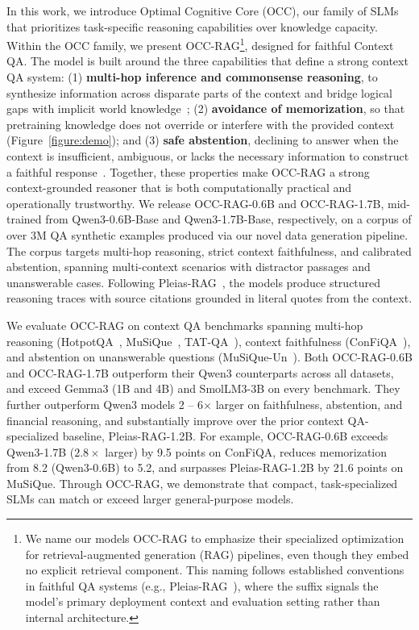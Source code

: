 In this work, we introduce Optimal Cognitive Core (OCC), our family of SLMs that prioritizes task-specific reasoning capabilities over knowledge capacity. Within the OCC family, we present OCC-RAG\footnote{We name our models OCC-RAG to emphasize their specialized optimization for retrieval-augmented generation (RAG) pipelines, even though they embed no explicit retrieval component. This naming follows established conventions in faithful QA systems (e.g., Pleias-RAG~\citep{pleias}), where the suffix signals the model's primary deployment context and evaluation setting rather than internal architecture.}, designed for faithful Context QA. The model is built around the three capabilities that define a strong context QA system: (1) \textbf{multi-hop inference and commonsense reasoning}, to synthesize information across disparate parts of the context and bridge logical gaps with implicit world knowledge~\citep{yu2023naturallanguagereasoningsurvey}; (2) \textbf{avoidance of memorization}, so that pretraining knowledge does not override or interfere with the provided context~\citep{ghosh2024quantifying} (Figure~\ref{figure:demo}); and (3) \textbf{safe abstention}, declining to answer when the context is insufficient, ambiguous, or lacks the necessary information to construct a faithful response~\citep{kirichenko2026abstentionbench}. Together, these properties make OCC-RAG a strong context-grounded reasoner that is both computationally practical and operationally trustworthy. We release OCC-RAG-0.6B and OCC-RAG-1.7B, mid-trained from Qwen3-0.6B-Base and Qwen3-1.7B-Base, respectively, on a corpus of over 3M QA synthetic examples produced via our novel data generation pipeline. The corpus targets multi-hop reasoning, strict context faithfulness, and calibrated abstention, spanning multi-context scenarios with distractor passages and unanswerable cases. Following Pleias-RAG~\citep{pleias}, the models produce structured reasoning traces with source citations grounded in literal quotes from the context. 

We evaluate OCC-RAG on context QA benchmarks spanning multi-hop reasoning (HotpotQA~\citep{hotpotqa}, MuSiQue~\citep{musique}, TAT-QA~\citep{tat-qa}), context faithfulness (ConFiQA~\citep{bi-etal-2025-context}), and abstention on unanswerable questions (MuSiQue-Un~\cite{musique}). Both OCC-RAG-0.6B and OCC-RAG-1.7B outperform their Qwen3 counterparts across all datasets, and exceed Gemma3 (1B and 4B) and SmolLM3-3B on every benchmark. They further outperform Qwen3 models 2 -- 6$\times$ larger on faithfulness, abstention, and financial reasoning, and substantially improve over the prior context QA-specialized baseline, Pleias-RAG-1.2B. For example, OCC-RAG-0.6B exceeds Qwen3-1.7B ($2.8\times$ larger) by 9.5 points on ConFiQA, reduces memorization from 8.2 (Qwen3-0.6B) to 5.2, and surpasses Pleias-RAG-1.2B by 21.6 points on MuSiQue. Through OCC-RAG, we demonstrate that compact, task-specialized SLMs can match or exceed larger general-purpose models.


